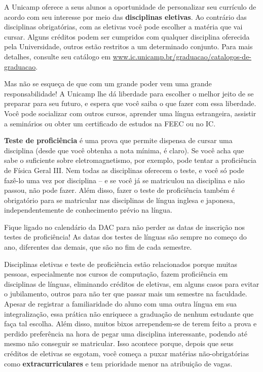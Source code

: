 A Unicamp oferece a seus alunos a oportunidade de personalizar seu currículo de
acordo com seu interesse por meio das \textbf{disciplinas eletivas}. Ao contrário das
disciplinas obrigatórias, com as eletivas você pode escolher a matéria que vai cursar. Alguns
créditos podem ser cumpridos com qualquer disciplina oferecida pela
Universidade, outros estão restritos a um determinado conjunto. Para mais
detalhes, consulte seu catálogo em
\url{www.ic.unicamp.br/graduacao/catalogos-de-graduacao}.

Mas não se esqueça de que com um grande poder vem uma grande responsabilidade!
A Unicamp lhe dá liberdade para escolher o melhor jeito de se preparar para seu
futuro, e espera que você saiba o que fazer com essa liberdade. Você pode socializar com
outros cursos, aprender uma língua estrangeira, assistir a seminários ou obter
um certificado de estudos na FEEC ou no IC.

\textbf{Teste de proficiência} é uma prova que permite dispensa de cursar uma disciplina
(desde que você obtenha a nota mínima, é claro). Se você acha que sabe o suficiente
sobre eletromagnetismo, por exemplo, pode tentar a proficiência de Física Geral III.
Nem todas as disciplinas oferecem o teste, e você só pode fazê-lo uma vez por
disciplina -- e se você já se matriculou na disciplina e não passou, não pode fazer.
Além disso, fazer o teste de proficiência também é obrigatório para se matricular
nas disciplinas de língua inglesa e japonesa, independentemente de conhecimento
prévio na língua.

Fique ligado no calendário da DAC para não perder as datas de inscrição nos
testes de proficiência! As datas dos testes de línguas são sempre no começo do
ano, diferentes das demais, que são no fim de cada semestre.

Disciplinas eletivas e teste de proficiência estão relacionados porque muitas pessoas,
especialmente nos cursos de computação, fazem proficiência em
disciplinas de línguas, eliminando créditos de eletivas, em alguns casos para evitar o jubilamento, outros para não ter que
passar mais um semestre na faculdade. Apesar de registrar a familiaridade do
aluno com uma outra língua em sua integralização, essa prática não enriquece
a graduação de nenhum estudante que faça tal escolha. Além disso, muitos bixos
arrependem-se de terem feito a prova e perdido preferência na hora de pegar uma
disciplina interessante, podendo até mesmo não conseguir se matricular. Isso acontece
porque, depois que seus créditos de eletivas se esgotam, você começa a puxar matérias
não-obrigatórias como \textbf{extracurriculares} e tem prioridade menor na
atribuição de vagas.


